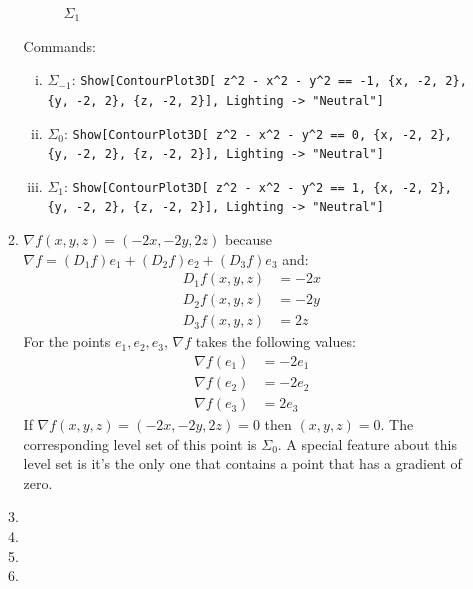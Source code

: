 \documentclass[letterpaper,10pt]{article}
\begin{document}
\begin{enumerate}
\begin{enumerate}
\begin{figure}[ht]
\begin{minipage}[b]{0.30\linewidth}
				\caption{$\Sigma_1$}
				\label{fig:figure2}
			\end{minipage}
		\end{figure}

		Commands:
		\begin{enumerate}[i.]
			\item $\Sigma_{-1}$:
			{\tt Show[ContourPlot3D[
  z\verb|^|2 - x\verb|^|2 - y\verb|^|2 == -1, \{x, -2, 2\}, \{y, -2, 2\}, \{z, -2, 2\}], 
 Lighting -> "Neutral"] }
			\item $\Sigma_{0}$:
			{\tt Show[ContourPlot3D[
  z\verb|^|2 - x\verb|^|2 - y\verb|^|2 == 0, \{x, -2, 2\}, \{y, -2, 2\}, \{z, -2, 2\}], 
 Lighting -> "Neutral"] }
			\item $\Sigma_{1}$:
			{\tt Show[ContourPlot3D[
  z\verb|^|2 - x\verb|^|2 - y\verb|^|2 == 1, \{x, -2, 2\}, \{y, -2, 2\}, \{z, -2, 2\}], 
 Lighting -> "Neutral"] }
		\end{enumerate}
		\item $\nabla f (x,y,z) = (-2x, -2y, 2z)$ because $\nabla f = (D_1 f)e_1 + (D_2 f)e_2 + (D_3 f)e_3$ and: 
		\begin{align*}
			D_1 f (x,y,z) & = -2x \\
			D_2 f (x,y,z) & = -2y \\ 
			D_3 f (x,y,z) & = 2z
		\end{align*}
		For the points $e_1, e_2, e_3$, $\nabla f$ takes the following values:
		\begin{align*}
			\nabla f (e_1) & = -2 e_1 \\
			\nabla f (e_2) & = -2 e_2 \\ 
			\nabla f (e_3) & = 2 e_3
		\end{align*}
		If $\nabla f(x, y, z) = (-2x, -2y, 2z) = 0$ then $(x, y, z) = 0$. The corresponding level set of this point is $\Sigma_0$. A special feature about this level set is it's the only one that contains a point that has a gradient of zero. 
		\item 
		\item 
		\item 
		\item 
	\end{enumerate}


\end{enumerate}
\end{document}
